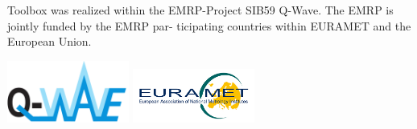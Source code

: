 \documentclass[12pt,a4paper,oneside]{report} %
\begin{document}
Toolbox was realized within the EMRP-Project SIB59 Q-Wave. The EMRP is jointly funded by the EMRP
par- ticipating countries within EURAMET and the European Union.

\vspace{4em}
\includegraphics[width=0.3\textwidth]{sources/Q-Wave_logo_01.pdf}
\hfill
\includegraphics[width=0.3\textwidth]{sources/eurametlogo.jpg}
\end{document}

